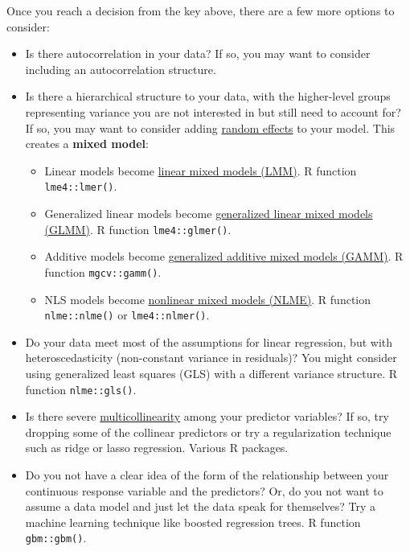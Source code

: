 \documentclass[
  13,
  letterpaper,
]{report}
\providecommand{\tightlist}{%
  \setlength{\itemsep}{0pt}\setlength{\parskip}{0pt}}
\begin{document}
Once you reach a decision from the key above, there are a few more
options to consider:

\begin{itemize}
\tightlist
\item
  Is there autocorrelation in your data? If so, you may want to consider
  including an autocorrelation structure.
\item
  Is there a hierarchical structure to your data, with the higher-level
  groups representing variance you are not interested in but still need
  to account for? If so, you may want to consider adding
  \href{@sec-mixed-effects}{random effects} to your model. This creates
  a \textbf{mixed model}:

  \begin{itemize}
  \tightlist
  \item
    Linear models become \href{@sec-mixed-lme}{linear mixed models
    (LMM)}. R function \texttt{lme4::lmer()}.
  \item
    Generalized linear models become \href{sec-mixed-glmm}{generalized
    linear mixed models (GLMM)}. R function \texttt{lme4::glmer()}.
  \item
    Additive models become \href{sec-mixed-gamm}{generalized additive
    mixed models (GAMM)}. R function \texttt{mgcv::gamm()}.
  \item
    NLS models become \href{sec-mixed-nlme}{nonlinear mixed models
    (NLME)}. R function \texttt{nlme::nlme()} or \texttt{lme4::nlmer()}.
  \end{itemize}
\item
  Do your data meet most of the assumptions for linear regression, but
  with heteroscedasticity (non-constant variance in residuals)? You
  might consider using generalized least squares (GLS) with a different
  variance structure. R function \texttt{nlme::gls()}.
\item
  Is there severe \href{@sec-problems-collin}{multicollinearity} among
  your predictor variables? If so, try dropping some of the collinear
  predictors or try a regularization technique such as ridge or lasso
  regression. Various R packages.
\item
  Do you not have a clear idea of the form of the relationship between
  your continuous response variable and the predictors? Or, do you not
  want to assume a data model and just let the data speak for
  themselves? Try a machine learning technique like boosted regression
  trees. R function \texttt{gbm::gbm()}.
\end{itemize}
\end{document}
